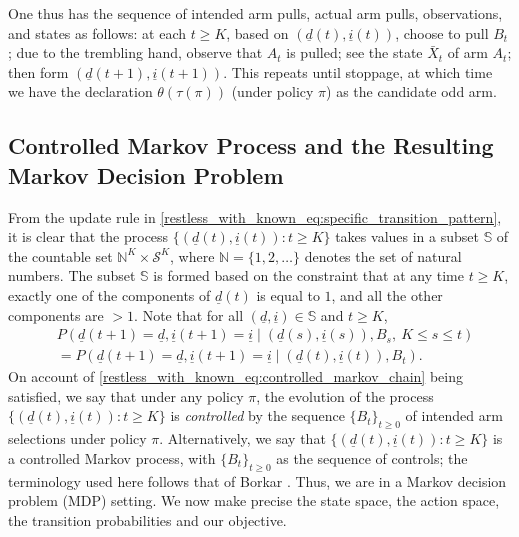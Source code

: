 One thus has the sequence of intended arm pulls, actual arm pulls, observations, and states as follows: at each $t \geq K$, based on $(\underline{d}(t), \underline{i}(t))$, choose to pull $B_{t}$; due to the trembling hand, observe that $A_{t}$ is pulled; see the state $\bar{X}_{t}$ of arm $A_t$; then form $(\underline{d}(t+1), \underline{i}(t+1)) $. This repeats until stoppage, at which time we have the declaration $\theta(\tau(\pi))$ (under policy $\pi$) as the candidate odd arm.

\subsection{Controlled Markov Process and the Resulting Markov Decision Problem}
From the update rule in \eqref{restless_with_known_eq:specific_transition_pattern}, it is clear that the process $\{(\underline{d}(t),\underline{i}(t)):t\geq K\}$ takes values in a subset $\mathbb{S}$ of the {countable} set $\mathbb{N}^K\times\mathcal{S}^K$, where $\mathbb{N}=\{1,2,\ldots\}$ denotes the set of natural numbers. The subset $\mathbb{S}$ is formed based on the constraint that at any time $t\geq K$, exactly one of the components of $\underline{d}(t)$ is equal to $1$, and all the other components are {\color{black} $>1$}. Note that for all $(\underline{d},\underline{i}) \in \mathbb{S}$ and $t\geq K$,
\begin{align}
	&P(\underline{d}(t+1)=\underline{d},\underline{i}(t+1)=\underline{i}\mid (\underline{d}(s),\underline{i}(s)),B_s,~K\leq s\leq t)\nonumber\\
	&=P(\underline{d}(t+1)=\underline{d},\underline{i}(t+1)=\underline{i}\mid (\underline{d}(t),\underline{i}(t)),B_t).\label{restless_with_known_eq:controlled_markov_chain}
\end{align}
On account of \eqref{restless_with_known_eq:controlled_markov_chain} being satisfied, we say that under any policy $\pi$, the evolution of the process $\{(\underline{d}(t),\underline{i}(t)):t\geq K\}$ is \emph{controlled} by the sequence $\{B_t\}_{t\geq 0}$ of intended arm selections under policy $\pi$. Alternatively, we say that $\{(\underline{d}(t),\underline{i}(t)):t\geq K\}$ is a controlled Markov process, with $\{B_t\}_{t\geq 0}$ as the sequence of controls; the terminology used here follows that of Borkar \cite{borkar1988control}. Thus, we are in a Markov decision problem (MDP) setting. We now make precise the state space, the action space, the transition probabilities and our objective.

